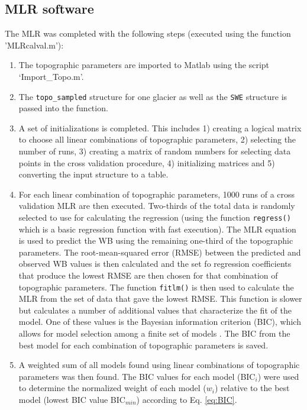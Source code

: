 \documentclass{sfuthesis}
\begin{document}
\begin{appendices}
	\chapter{MLR software}
\label{sec:MLRMethods}

The MLR was completed with the following steps (executed using the function 'MLRcalval.m'):
\begin{enumerate}
\item The topographic parameters are imported to Matlab using the script `Import\_Topo.m'.

\item The \texttt{topo\_sampled} structure for one glacier as well as the \texttt{SWE} structure is passed into the function.

\item A set of initializations is completed. This includes 1) creating a logical matrix to choose all linear combinations of topographic parameters, 2) selecting the number of runs, 3) creating a matrix of random numbers for selecting data points in the cross validation procedure, 4) initializing matrices and 5) converting the input structure to a table.

\item For each linear combination of topographic parameters, 1000 runs of a cross validation MLR are then executed. Two-thirds of the total data is randomly selected \citep{Kohavi1995} to use for calculating the regression (using the function \texttt{regress()} which is a basic regression function with fast execution). The MLR equation is used to predict the WB using the remaining one-third of the topographic parameters. The root-mean-squared error (RMSE) between the predicted and observed WB values is then calculated and the set fo regression coefficients that produce the lowest RMSE are then chosen for that combination of topographic parameters. The function \texttt{fitlm()} is then used to calculate the MLR from the set of data that gave the lowest RMSE. This function is slower but calculates a number of additional values that characterize the fit of the model. One of these values is the Bayesian information criterion (BIC), which allows for model selection among a finite set of models \citep{Burnham2004}. The BIC from the best model for each combination of topographic parameters is saved.

\item A weighted sum of all models found using linear combinations of topographic parameters was then found. The BIC values for each model (BIC$_i$) were used to determine the normalized weight of each model ($w_i$) relative to the best model (lowest BIC value BIC$_{min}$) according to Eq. \ref{eq:BIC}.


\end{enumerate}
\end{appendices}
\end{document}
